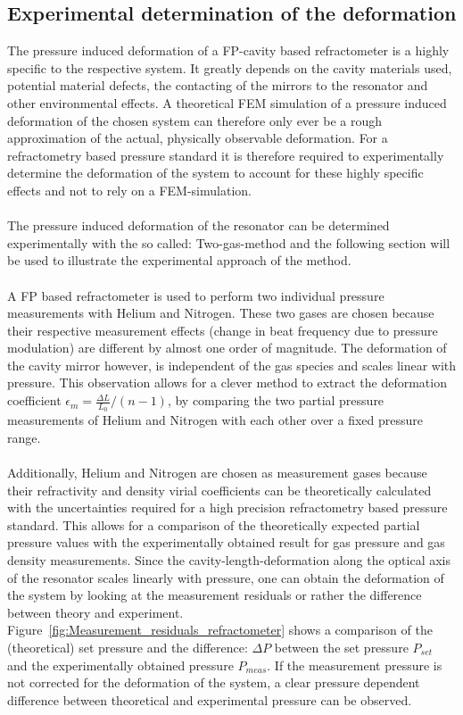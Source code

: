 \subsection{Experimental determination of the deformation}
The pressure induced deformation of a FP-cavity based refractometer is a highly specific to the respective system. It greatly depends on the cavity materials used, potential material defects, the contacting of the mirrors to the resonator and other environmental effects. A theoretical FEM simulation of a pressure induced deformation of the chosen system can therefore only ever be a rough approximation of the actual, physically observable deformation. For a refractometry based pressure standard it is therefore required to experimentally determine the deformation of the system to account for these highly specific effects and not to rely on a FEM-simulation. \\\\
The pressure induced deformation of the resonator can be determined experimentally with the so called: Two-gas-method and the following section will be used to illustrate the experimental approach of the method.\\\\
A FP based refractometer is used to perform two individual pressure measurements with Helium and Nitrogen. These two gases are chosen because their respective measurement effects (change in beat frequency due to pressure modulation) are different by almost one order of magnitude. The deformation of the cavity mirror however, is independent of the gas species and scales linear with pressure. This observation allows for a clever method to extract the deformation coefficient $\epsilon_m = \frac{\Delta L}{L_0}/(n-1)$, by comparing the two partial pressure measurements of Helium and Nitrogen with each other over a fixed  pressure range. \\\\
Additionally, Helium and Nitrogen are chosen as measurement gases because their refractivity and density virial coefficients can be theoretically calculated with the uncertainties required for a high precision refractometry based pressure standard. This allows for a comparison of the theoretically expected partial pressure values with the experimentally obtained result for gas pressure and gas density measurements. Since the cavity-length-deformation along the optical axis of the resonator scales linearly with pressure, one can obtain the deformation of the system by looking at the measurement residuals or rather the difference between theory and experiment.  \mbox{Figure \ref{fig:Measurement_residuals_refractometer}} shows a comparison of the (theoretical) set pressure and the difference: $\Delta P$ between the set pressure $P_{set}$ and the experimentally obtained pressure $P_{meas}$. If the measurement pressure is not corrected for the deformation of the system, a clear pressure dependent difference between theoretical and experimental pressure can be observed. \\\\
